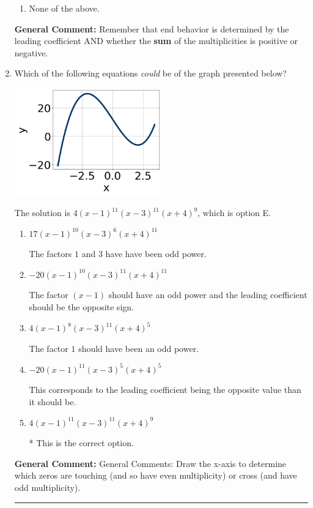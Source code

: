 \documentclass{extbook}[14pt]
\newcommand{\litem}[1]{\item #1

\rule{\textwidth}{0.4pt}}
\begin{document}
\begin{enumerate}
{\begin{enumerate}[label=\Alph*.]
\begin{multicols}{2}
\end{multicols}\item None of the above.\end{enumerate}
\textbf{General Comment:} Remember that end behavior is determined by the leading coefficient AND whether the \textbf{sum} of the multiplicities is positive or negative.
}
\litem{
Which of the following equations \textit{could} be of the graph presented below?

\begin{center}
    \includegraphics[width=0.5\textwidth]{../Figures/polyGraphToFunctionC.png}
\end{center}


The solution is \( 4(x - 1)^{11} (x - 3)^{11} (x + 4)^{9} \), which is option E.\begin{enumerate}[label=\Alph*.]
\item \( 17(x - 1)^{10} (x - 3)^{6} (x + 4)^{11} \)

The factors $1$ and $3$ have have been odd power.
\item \( -20(x - 1)^{10} (x - 3)^{11} (x + 4)^{11} \)

The factor $(x - 1)$ should have an odd power and the leading coefficient should be the opposite sign.
\item \( 4(x - 1)^{8} (x - 3)^{11} (x + 4)^{5} \)

The factor $1$ should have been an odd power.
\item \( -20(x - 1)^{11} (x - 3)^{5} (x + 4)^{5} \)

This corresponds to the leading coefficient being the opposite value than it should be.
\item \( 4(x - 1)^{11} (x - 3)^{11} (x + 4)^{9} \)

* This is the correct option.
\end{enumerate}

\textbf{General Comment:} General Comments: Draw the x-axis to determine which zeros are touching (and so have even multiplicity) or cross (and have odd multiplicity).
}
\end{enumerate}
\end{document}
